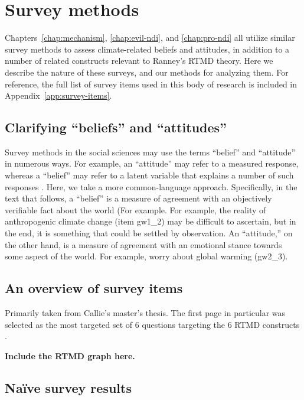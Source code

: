 \chapter{Survey methods}
\label{chap:survey}

Chapters~\ref{chap:mechanism}, \ref{chap:evil-ndi}, and \ref{chap:pro-ndi} all
utilize similar survey methods to assess climate-related beliefs and attitudes,
in addition to a number of related constructs relevant to Ranney's
\citeyear{ranney-rtmd} RTMD theory. Here we describe the nature of these
surveys, and our methods for analyzing them. For reference, the full list of
survey items used in this body of research is included in
Appendix~\ref{app:survey-items}.

\section{Clarifying “beliefs” and “attitudes”}

Survey methods in the social sciences may use the terms “belief” and “attitude”
in numerous ways. For example, an “attitude” may refer to a measured response,
whereas a “belief” may refer to a latent variable that explains a number of such
responses \cite{some-attitude-latent-var-ref}. Here, we take a more
common-language approach. Specifically, in the text that follows, a “belief” is
a measure of agreement with an objectively verifiable fact about the world (For
example. For example, the reality of anthropogenic climate change (item gw1_2)
may be difficult to ascertain, but in the end, it is something that could be
settled by observation. An “attitude,” on the other hand, is a measure of
agreement with an emotional stance towards some aspect of the world. For
example, worry about global warming (gw2_3).

\section{An overview of survey items}

Primarily taken from Callie’s master’s thesis. The first page in particular was
selected as the most targeted set of 6 questions targeting the 6 RTMD
constructs \cite{ranney-rtmd}.

\textbf{Include the RTMD graph here.}

\section{Na\"ive survey results}

